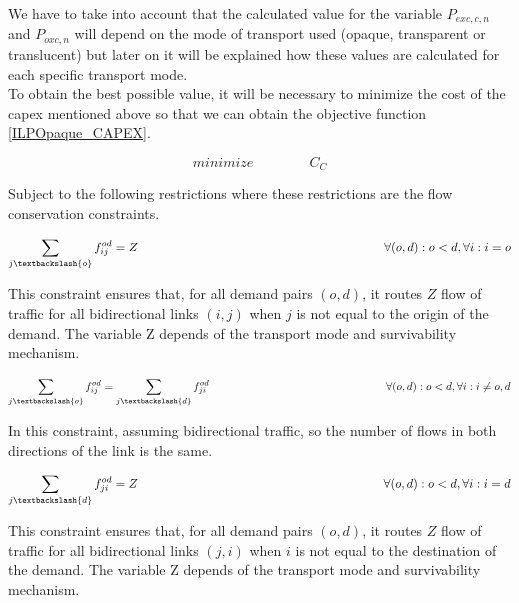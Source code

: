 \vspace{10pt}
We have to take into account that the calculated value for the variable $P_{exc,c,n}$ and $P_{oxc,n}$ will depend on the mode of transport used (opaque, transparent or translucent) but later on it will be explained how these values are calculated for each specific transport mode.\\

To obtain the best possible value, it will be necessary to minimize the cost of the capex mentioned above so that we can obtain the objective function \ref{ILPOpaque_CAPEX}.

\begin{equation}
minimize \qquad \qquad C_C
\label{ILPOpaque_CAPEX}
\end{equation}

\vspace{11pt}
Subject to the following restrictions where these restrictions are the flow conservation constraints.

\begin{equation}
\sum_{j\textbackslash \{o\}} f_{ij}^{od} = Z  \qquad \qquad \qquad \qquad \qquad \qquad \qquad \qquad \qquad \qquad
\forall(o,d) : o < d, \forall i: i = o
\label{ILPOpaque1_CAPEX}
\end{equation}

This constraint ensures that, for all demand pairs $(o,d)$, it routes $Z$ flow of traffic for all bidirectional links $(i,j)$ when $j$ is not equal to the origin of the demand. The variable Z depends of the transport mode and survivability mechanism.

\begin{equation}
\sum_{j\textbackslash \{o\}} f_{ij}^{od} = \sum_{j\textbackslash \{d\}} f_{ji}^{od}   \qquad \qquad \qquad \qquad \qquad \qquad \qquad \qquad
\forall(o,d) : o < d, \forall i: i \neq o,d
\label{ILPOpaque2_CAPEX}
\end{equation}

In this constraint, assuming bidirectional traffic, so the number of flows in both directions of the link is the same.

\begin{equation}
\sum_{j\textbackslash \{d\}} f_{ji}^{od} = Z  \qquad \qquad \qquad \qquad \qquad \qquad \qquad \qquad \qquad \qquad
\forall(o,d) : o < d, \forall i: i = d
\label{ILPOpaque3_CAPEX}
\end{equation}

This constraint ensures that, for all demand pairs $(o,d)$, it routes $Z$ flow of traffic for all bidirectional links $(j,i)$ when $i$ is not equal to the destination of the demand. The variable Z depends of the transport mode and survivability mechanism.

